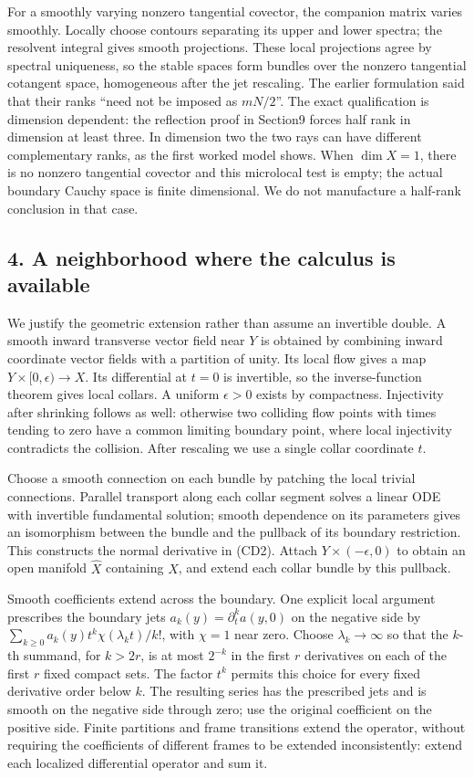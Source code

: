 \documentclass[
  11pt,
]{article}
\begin{document}
For a smoothly varying nonzero tangential covector, the companion matrix
varies smoothly. Locally choose contours separating its upper and lower
spectra; the resolvent integral gives smooth projections. These local
projections agree by spectral uniqueness, so the stable spaces form
bundles over the nonzero tangential cotangent space, homogeneous after
the jet rescaling. The earlier formulation said that their ranks ``need
not be imposed as \(mN/2\)''. The exact qualification is dimension
dependent: the reflection proof in Section9 forces half rank in
dimension at least three. In dimension two the two rays can have
different complementary ranks, as the first worked model shows. When
\(\dim X=1\), there is no nonzero tangential covector and this
microlocal test is empty; the actual boundary Cauchy space is finite
dimensional. We do not manufacture a half-rank conclusion in that case.

\subsection{4. A neighborhood where the calculus is
available}\label{a-neighborhood-where-the-calculus-is-available}

We justify the geometric extension rather than assume an invertible
double. A smooth inward transverse vector field near \(Y\) is obtained
by combining inward coordinate vector fields with a partition of unity.
Its local flow gives a map \(Y\times[0,\epsilon)\to X\). Its
differential at \(t=0\) is invertible, so the inverse-function theorem
gives local collars. A uniform \(\epsilon>0\) exists by compactness.
Injectivity after shrinking follows as well: otherwise two colliding
flow points with times tending to zero have a common limiting boundary
point, where local injectivity contradicts the collision. After
rescaling we use a single collar coordinate \(t\).

Choose a smooth connection on each bundle by patching the local trivial
connections. Parallel transport along each collar segment solves a
linear ODE with invertible fundamental solution; smooth dependence on
its parameters gives an isomorphism between the bundle and the pullback
of its boundary restriction. This constructs the normal derivative in
(CD2). Attach \(Y\times(-\epsilon,0)\) to obtain an open manifold
\(\widehat X\) containing \(X\), and extend each collar bundle by this
pullback.

Smooth coefficients extend across the boundary. One explicit local
argument prescribes the boundary jets \(a_k(y)=\partial_t^ka(y,0)\) on
the negative side by \(\sum_{k\geq0}a_k(y)t^k\chi(\lambda_kt)/k!\), with
\(\chi=1\) near zero. Choose \(\lambda_k\to\infty\) so that the \(k\)-th
summand, for \(k>2r\), is at most \(2^{-k}\) in the first \(r\)
derivatives on each of the first \(r\) fixed compact sets. The factor
\(t^k\) permits this choice for every fixed derivative order below
\(k\). The resulting series has the prescribed jets and is smooth on the
negative side through zero; use the original coefficient on the positive
side. Finite partitions and frame transitions extend the operator,
without requiring the coefficients of different frames to be extended
inconsistently: extend each localized differential operator and sum it.
\end{document}
